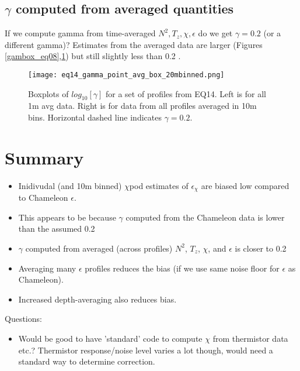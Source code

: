 \documentclass[11pt]{article}
\begin{document}
%







\clearpage
\subsection{$\gamma$ computed from averaged quantities}

If we compute gamma from time-averaged $N^2,T_z,\chi,\epsilon$ do we get $\gamma=0.2$ (or a different gamma)? Estimates from the averaged data are larger (Figures \ref{gambox_eq08},\ref{gambox_eq14}) but still slightly less than 0.2 .

\begin{figure}[htbp]
\texttt{[image: eq14\_gamma\_point\_avg\_box\_20mbinned.png]}
\caption{Boxplots of $log_{10}[\gamma]$ for a set of profiles from EQ14. Left is for all 1m avg data. Right is for data from all profiles averaged in 10m bins. Horizontal dashed line indicates $\gamma=0.2$.}
\label{gambox_eq14}
\end{figure}



\clearpage
\section{Summary}

\begin{itemize}

\item Inidivudal (and 10m binned) $\chi$pod estimates of $\epsilon_{\chi}$ are biased low compared to Chameleon $\epsilon$.

\item This appears to be because $\gamma$ computed from the Chameleon data is lower than the assumed 0.2

\item $\gamma$ computed from averaged (across profiles) $N^2$, $T_z$, $\chi$, and $\epsilon$ is closer to 0.2

\item Averaging many $\epsilon$ profiles reduces the bias (if we use same noise floor for $\epsilon$ as Chameleon).

\item Increased depth-averaging also reduces bias.

\end{itemize}

Questions:

\begin{itemize}
\item Would be good to have 'standard' code to compute $\chi$ from thermistor data etc.? Thermistor response/noise level varies a lot though, would need a standard way to determine correction.
\end{itemize}
\end{document}
